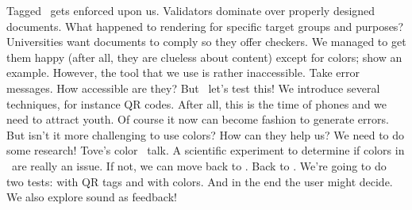 



\setupbackgrounds
  [text]
  [background=extratext]

\startdocument
  [title={blowing the whistle},
   banner={tagged or flagged},
   location={bachotex\enspace {\bf 2025}\enspace meeting}]

\starttitle[title=Outline]

\startitemize
\startitem
    Tagged \PDF\ gets enforced upon us. Validators dominate over properly designed
    documents. What happened to rendering for specific target groups and
    purposes?
\stopitem
\startitem
    Universities want documents to comply so they offer checkers. We managed to
    get them happy (after all, they are clueless about content) except for
    colors; show an example.
\stopitem
\startitem
    However, the tool that we use is rather inaccessible. Take error messages.
    How accessible are they?
\stopitem
\startitem
    But \unknown\ let's test this! We introduce several techniques, for instance
    QR codes. After all, this is the time of phones and we need to attract youth.
    Of course it now can become fashion to generate errors.
\stopitem
\startitem
    But isn't it more challenging to use colors? How can they help us? We need to
    do some research!
\stopitem
\startitem
    Tove's color \PDF\ talk. A scientific experiment to determine if colors in
    \PDF\ are really an issue. If not, we can move back to \TEX.
\stopitem
\startitem
    Back to \TEX. We're going to do two tests: with QR tags and with colors. And
    in the end the user might decide. We also explore sound as feedback!
\stopitem
\stopitemize

\stoptitle

\stopdocument
